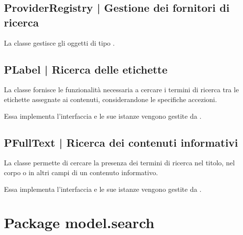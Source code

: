 \documentclass[10pt,a4paper,headinclude,footinclude,hidelinks]{scrreprt} %
\begin{document}
	\subsection[ProviderRegistry]{ProviderRegistry | Gestione dei fornitori di ricerca}
	\label{sec:stage:design:model.search:provider-registry}
	La classe \textit{} gestisce gli oggetti di tipo \textit{}.

	\subsection[PLabel]{PLabel | Ricerca delle etichette}
	\label{sec:stage:design:model.search:tag-provider}
	La classe \textit{} fornisce le funzionalità necessaria a cercare i termini di ricerca tra le etichette assegnate ai contenuti, considerandone le specifiche accezioni.

	Essa implementa l'interfaccia \textit{} e le sue istanze vengono gestite da \textit{}.

	\subsection[PFullText]{PFullText | Ricerca dei contenuti informativi}
	\label{sec:stage:design:model.search:full-text-provider}
	La classe \textit{} permette di cercare la presenza dei termini di ricerca nel titolo, nel corpo o in altri campi di un contenuto informativo.

	Essa implementa l'interfaccia \textit{} e le sue istanze vengono gestite da \textit{}.

	\section{Package model.search}
	\label{sec:stage:design:model.search}
\end{document}
